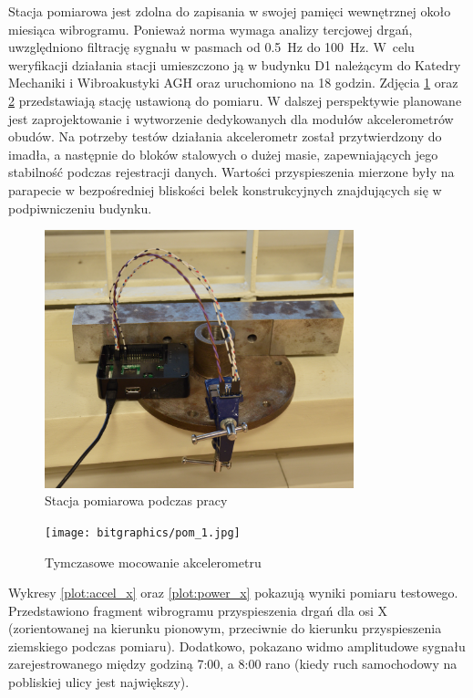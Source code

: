 \documentclass[a4paper,12pt]{mwart}
\begin{document}
Stacja pomiarowa jest zdolna do zapisania w swojej pamięci wewnętrznej około
miesiąca wibrogramu. Ponieważ norma wymaga analizy tercjowej drgań, uwzględniono
filtrację sygnału w pasmach od \SI{0,5}{\hertz} do \SI{100}{\hertz}. W~celu
weryfikacji działania stacji umieszczono ją w budynku D1 należącym do Katedry
Mechaniki i Wibroakustyki AGH oraz uruchomiono na 18 godzin. Zdjęcia
\ref{fig:pomiar1} oraz \ref{fig:imadlo} przedstawiają stację ustawioną do
pomiaru. W dalszej perspektywie planowane jest zaprojektowanie i wytworzenie
dedykowanych dla modułów akcelerometrów obudów. Na potrzeby testów działania
akcelerometr został przytwierdzony do imadła, a następnie do bloków stalowych o
dużej masie, zapewniających jego stabilność podczas rejestracji danych. Wartości
przyspieszenia mierzone były na parapecie w bezpośredniej bliskości belek
konstrukcyjnych znajdujących się w podpiwniczeniu budynku.

\begin{figure}[!tbh]
  \centering
  \includegraphics[width=0.8\textwidth]{bitgraphics/pom_2_cut.jpg}
  \caption{Stacja pomiarowa podczas pracy}
  \label{fig:pomiar1}
\end{figure}

\begin{figure}[!tbh]
  \centering
  \texttt{[image: bitgraphics/pom\_1.jpg]}
  \caption{Tymczasowe mocowanie akcelerometru}
  \label{fig:imadlo}
\end{figure}

Wykresy \ref{plot:accel_x} oraz \ref{plot:power_x} pokazują wyniki pomiaru
testowego. Przedstawiono fragment wibrogramu przyspieszenia drgań dla osi X
(zorientowanej na kierunku pionowym, przeciwnie do kierunku przyspieszenia
ziemskiego podczas pomiaru). Dodatkowo, pokazano widmo amplitudowe sygnału
zarejestrowanego między godziną 7:00, a 8:00 rano (kiedy ruch samochodowy na
pobliskiej ulicy jest największy).
\end{document}
